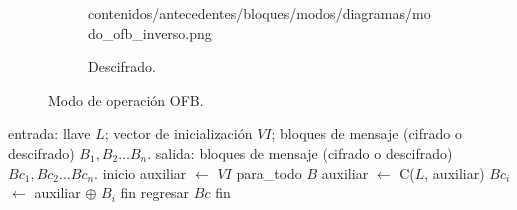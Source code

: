 \begin{figure}[H]
\begin{subfigure}{0.45\textwidth}
\begin{center}
            {contenidos/antecedentes/bloques/modos/diagramas/modo_ofb_inverso.png}
          \caption{Descifrado.}
      \end{center}
  \end{subfigure}
  \caption{Modo de operación OFB.}
\end{figure}

\begin{pseudocodigo}[caption={Modo de operación OFB (cifrado y descifrado).}]
  entrada: llave $ L $; vector de inicialización $ VI $;
           bloques de mensaje (cifrado o descifrado) $ B_1, B_2 \dots B_n $.
  salida:  bloques de mensaje (cifrado o descifrado) $ Bc_1, Bc_2 \dots Bc_n $.
  inicio
    auxiliar $\gets$ $ VI $
    para_todo $B$
      auxiliar $\gets$ C($L$, auxiliar)
      $Bc_i$ $\gets$  auxiliar $\oplus$ $B_i$
    fin
    regresar $Bc$
  fin
\end{pseudocodigo}
